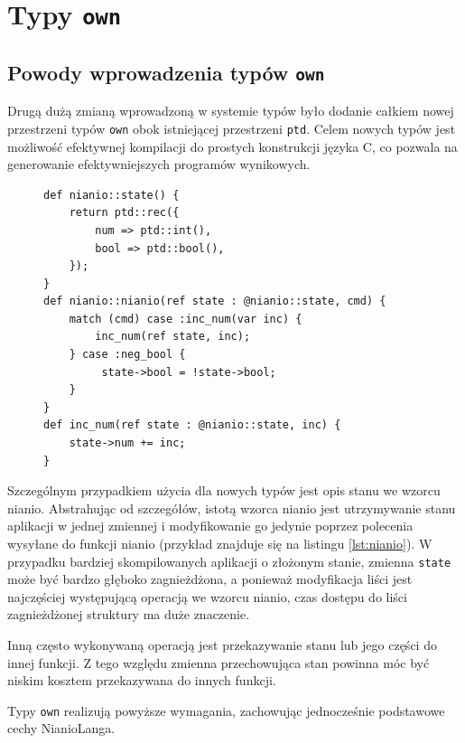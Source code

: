 \documentclass[licencjacka]{pracamgr}
\begin{document}
\section{Typy \texttt{own}}
\subsection{Powody wprowadzenia typów \texttt{own}}
Drugą dużą zmianą wprowadzoną w systemie typów było dodanie całkiem nowej przestrzeni typów \texttt{own} obok
istniejącej przestrzeni \texttt{ptd}. Celem nowych typów jest możliwość efektywnej kompilacji do
prostych konstrukcji języka C, co pozwala na generowanie efektywniejszych programów wynikowych.

\begin{figure}
\begin{lstlisting}[caption={Przykład funkcji nianio},label={lst:nianio},aboveskip=-15pt,language=nl]
def nianio::state() {
    return ptd::rec({
        num => ptd::int(),
        bool => ptd::bool(),
    });
}
def nianio::nianio(ref state : @nianio::state, cmd) {
    match (cmd) case :inc_num(var inc) {
        inc_num(ref state, inc);
    } case :neg_bool {
         state->bool = !state->bool;
    }
}
def inc_num(ref state : @nianio::state, inc) {
    state->num += inc;
}
\end{lstlisting}
\end{figure}
Szczególnym przypadkiem użycia dla nowych typów jest opis stanu we wzorcu nianio.
Abstrahując od szczegółów, istotą wzorca nianio jest utrzymywanie stanu aplikacji w jednej zmiennej
i modyfikowanie go jedynie poprzez polecenia wysyłane do funkcji nianio (przykład znajduje się
na listingu \ref{lst:nianio}). W przypadku bardziej skompilowanych aplikacji o złożonym stanie,
zmienna \texttt{state} może być bardzo głęboko zagnieżdżona, a ponieważ modyfikacja liści jest najczęściej
występującą operacją we wzorcu nianio, czas dostępu do liści zagnieżdżonej
struktury ma duże znaczenie.

Inną często wykonywaną operacją jest przekazywanie stanu lub jego części do innej funkcji. Z tego względu zmienna
przechowująca stan powinna móc być niskim kosztem przekazywana do innych funkcji. 

Typy \texttt{own} realizują powyższe wymagania, zachowując jednocześnie podstawowe cechy NianioLanga.
\end{document}
